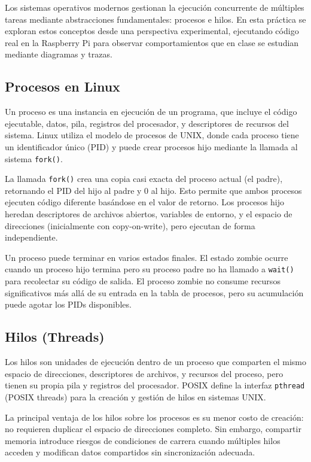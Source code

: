 \documentclass[conference]{IEEEtran}
\begin{document}
Los sistemas operativos modernos gestionan la ejecución concurrente de múltiples tareas mediante abstracciones fundamentales: procesos e hilos. En esta práctica se exploran estos conceptos desde una perspectiva experimental, ejecutando código real en la Raspberry Pi para observar comportamientos que en clase se estudian mediante diagramas y trazas.

\subsection{Procesos en Linux}

Un proceso es una instancia en ejecución de un programa, que incluye el código ejecutable, datos, pila, registros del procesador, y descriptores de recursos del sistema. Linux utiliza el modelo de procesos de UNIX, donde cada proceso tiene un identificador único (PID) y puede crear procesos hijo mediante la llamada al sistema \texttt{fork()}.

La llamada \texttt{fork()} crea una copia casi exacta del proceso actual (el padre), retornando el PID del hijo al padre y 0 al hijo. Esto permite que ambos procesos ejecuten código diferente basándose en el valor de retorno. Los procesos hijo heredan descriptores de archivos abiertos, variables de entorno, y el espacio de direcciones (inicialmente con copy-on-write), pero ejecutan de forma independiente.

Un proceso puede terminar en varios estados finales. El estado zombie ocurre cuando un proceso hijo termina pero su proceso padre no ha llamado a \texttt{wait()} para recolectar su código de salida. El proceso zombie no consume recursos significativos más allá de su entrada en la tabla de procesos, pero su acumulación puede agotar los PIDs disponibles.

\subsection{Hilos (Threads)}

Los hilos son unidades de ejecución dentro de un proceso que comparten el mismo espacio de direcciones, descriptores de archivos, y recursos del proceso, pero tienen su propia pila y registros del procesador. POSIX define la interfaz \texttt{pthread} (POSIX threads) para la creación y gestión de hilos en sistemas UNIX.

La principal ventaja de los hilos sobre los procesos es su menor costo de creación: no requieren duplicar el espacio de direcciones completo. Sin embargo, compartir memoria introduce riesgos de condiciones de carrera cuando múltiples hilos acceden y modifican datos compartidos sin sincronización adecuada.
\end{document}
